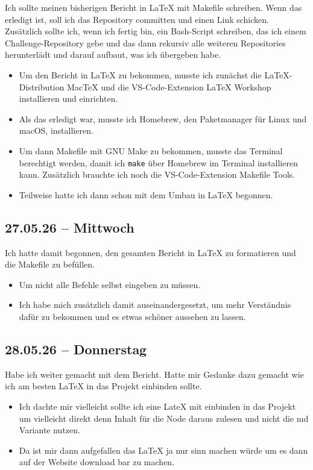 Ich sollte meinen bisherigen Bericht in LaTeX mit Makefile schreiben. Wenn das erledigt ist, soll ich das Repository committen und einen Link schicken. Zusätzlich sollte ich, wenn ich fertig bin, ein Bash-Script schreiben, das ich einem Challenge-Repository gebe und das dann rekursiv alle weiteren Repositories herunterlädt und darauf aufbaut, was ich übergeben habe.
\begin{itemize}
    \item Um den Bericht in LaTeX zu bekommen, musste ich zunächst die LaTeX-Distribution MacTeX und die VS-Code-Extension LaTeX Workshop installieren und einrichten.
    \item Als das erledigt war, musste ich Homebrew, den Paketmanager für Linux und macOS, installieren.
    \item Um dann Makefile mit GNU Make zu bekommen, musste das Terminal berechtigt werden, damit ich \texttt{make} über Homebrew im Terminal installieren kann. Zusätzlich brauchte ich noch die VS-Code-Extension Makefile Tools.
    \item Teilweise hatte ich dann schon mit dem Umbau in LaTeX begonnen.
\end{itemize}

\subsection{27.05.26 -- Mittwoch}

Ich hatte damit begonnen, den gesamten Bericht in LaTeX zu formatieren und die Makefile zu befüllen.
\begin{itemize}
    \item Um nicht alle Befehle selbst eingeben zu müssen.
    \item Ich habe mich zusätzlich damit auseinandergesetzt, um mehr Verständnis dafür zu bekommen und es etwas schöner aussehen zu lassen.
\end{itemize}

\subsection{28.05.26 -- Donnerstag}

Habe ich weiter gemacht mit dem Bericht. Hatte mir Gedanke dazu gemacht wie ich am besten LaTeX in das Projekt einbinden sollte.
\begin{itemize}
  \item Ich dachte mir vielleicht sollte ich eine LateX mit einbinden in das Projekt um vielleicht direkt denn Inhalt für die Node daraus zulesen und nicht die md Variante nutzen.
  \item Da ist mir dann aufgefallen das LaTeX ja nur sinn machen würde um es dann auf der Website download bar zu machen.
\end{itemize}

